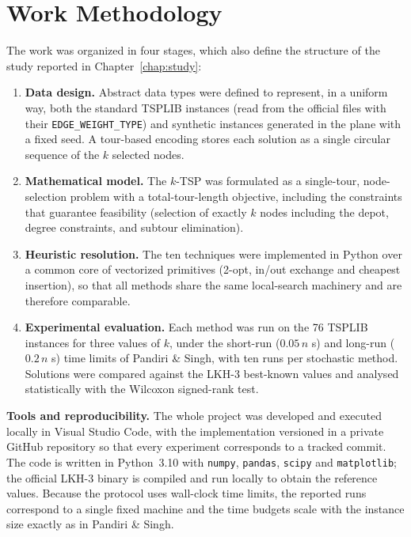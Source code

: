 \documentclass[12pt,a4paper,oneside]{report}
\begin{document}
\section{Work Methodology}
The work was organized in four stages, which also define the structure of the
study reported in Chapter~\ref{chap:study}:

\begin{enumerate}[label=(\alph*),leftmargin=*]
  \item \textbf{Data design.} Abstract data types were defined to represent, in a
  uniform way, both the standard TSPLIB instances (read from the official files
  with their \texttt{EDGE\_WEIGHT\_TYPE}) and synthetic instances generated in the
  plane with a fixed seed. A tour-based encoding stores each solution as a single
  circular sequence of the $k$ selected nodes.
  \item \textbf{Mathematical model.} The $k$-TSP was formulated as a single-tour,
  node-selection problem with a total-tour-length objective, including the
  constraints that guarantee feasibility (selection of exactly $k$ nodes including
  the depot, degree constraints, and subtour elimination).
  \item \textbf{Heuristic resolution.} The ten techniques were implemented in
  Python over a common core of vectorized primitives (2-opt, in/out exchange and
  cheapest insertion), so that all methods share the same local-search machinery
  and are therefore comparable.
  \item \textbf{Experimental evaluation.} Each method was run on the 76 TSPLIB
  instances for three values of $k$, under the short-run ($0.05\,n$ s) and
  long-run ($0.2\,n$ s) time limits of Pandiri \& Singh, with ten runs per
  stochastic method. Solutions were compared against the LKH-3 best-known values
  and analysed statistically with the Wilcoxon signed-rank test.
\end{enumerate}

\noindent\textbf{Tools and reproducibility.} The whole project was developed and
executed locally in Visual Studio Code, with the implementation versioned in a
private GitHub repository so that every experiment corresponds to a tracked
commit. The code is written in Python~3.10 with \texttt{numpy}, \texttt{pandas},
\texttt{scipy} and \texttt{matplotlib}; the official LKH-3 binary is compiled and
run locally to obtain the reference values. Because the protocol uses wall-clock
time limits, the reported runs correspond to a single fixed machine and the time
budgets scale with the instance size exactly as in Pandiri \& Singh.
\end{document}
